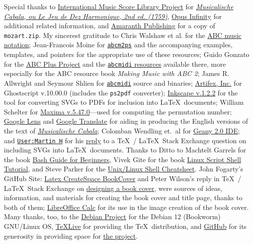 \documentclass[a4paper,x11names,svgnames,10pt]{article}
\begin{document}
{Special thanks to \href{https://imslp.org}{International Music Score Library Project} for \href{https://imslp.org/wiki/Ludus_Melothedicus_(Anonymous)}{\it Musicalische Cabala, ou Le Jeu de Dez Harmonique, 2nd ed. (1759)}, \href{https://opus-infinity.org}{Opus Infinity} for additional related information, and \href{http://www.amaranthpublishing.com/MozartDiceGame.htm}{Amaranth Publishing} for a copy of {\tt mozart.zip}. My sincerest gratitude to Chris Walshaw et al. for the \href{http://www.abcnotation.com/}{ABC music notation}; Jean-Francois Moine for \href{http://moinejf.free.fr/}{\tt abcm2ps} and the accompanying examples, templates, and pointers for the appropriate use of these resources; Guido Gonzato for the \href{http://abcplus.sourceforge.net/}{ABC Plus Project} and the \href{http://abcplus.sourceforge.net/#abcMIDI}{{\tt abcmidi} resources} available there, more especially for the ABC resource book {\em Making Music with ABC 2}; James R. Allwright and Seymour Shlien for \href{http://abc.sourceforge.net/abcMIDI}{\tt abcmidi} source and binaries; \href{https://artifex.com/}{Artifex, Inc.} for Ghostscript v.10.00.0 (includes the {\tt ps2pdf} converter); \href{https://www.inkscape.org/}{Inkscape v.1.2.2} for the tool for converting SVGs to PDFs for inclusion into \LaTeX\ documents; William Schelter for \href{https://maxima.sourceforge.io}{Maxima v.5.47.0}---used for computing the permutation number; \href{https://google.lens}{Google Lens} and \href{https://translate.google.com}{Google Translate} for aiding in producing the English versions of the text of \href{https://imslp.org/wiki/Musicalische_Cabala_(Schola\%2C_Franciscus)}{{\em Musicalische Cabala}}; Colomban Wendling et.\ al for \href{https://www.geany.org}{Geany 2.0 IDE}; and \href{https://tex.stackexchange.com/users/632/martin-h}{\tt User:Martin H} for his \href{https://tex.stackexchange.com/questions/2099/how-to-include-svg-diagrams-in-latex}{reply} to a \TeX\ / \LaTeX\ Stack Exchange question on including SVGs into \LaTeX\ documents. Thanks to  Ditto to Machtelt Garrels for the book \href{http://tldp.org/LDP/Bash-Beginners-Guide/html/Bash-Beginners-Guide.html}{Bash Guide for Beginners}, Vivek Gite for the book \href{http://www.freeos.com/guides/lsst/}{Linux Script Shell Tutorial}, and Steve Parker for the \href{http://steve-parker.org/sh/cheatsheet.pdf}{Unix/Linux Shell Cheatsheet}. John Fogarty's GitHub Site: \href{https://github.com/jfogarty/latex-createspace-bookcover}{Latex CreateSpace BookCover} and Peter Wilson's reply in  \TeX\ / \LaTeX\ Stack Exchange on \href{https://tex.stackexchange.com/questions/17579/how-can-i-design-a-book-cover}{designing a book cover}, were sources of ideas, information, and materials for creating the book cover and title page, thanks to both of them; \href{http://www.libreoffice.org/}{LibreOffice Calc} for its use in the image creation of the book cover.  Many thanks, too, to the \href{https://www.debian.org}{Debian Project} for the Debian 12 (Bookworm) GNU/Linux OS, \href{http://www.tug.org/texlive/}{TeXLive} for providing the \TeX\ distribution,  and \href{https://github.com}{GitHub} for its generosity in providing space for \href{https://github.com/justineuro/mdgBookSVG8Kit}{the project}.  

}
\end{document}

